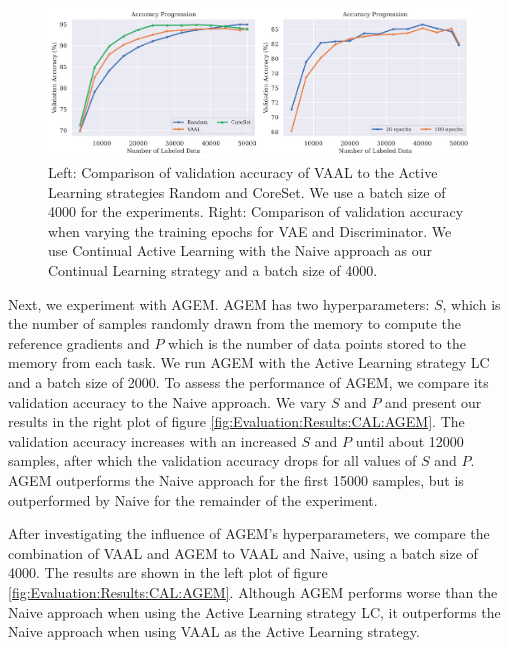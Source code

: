\begin{figure}[h]
    \centering
    \includegraphics[width=\linewidth]{images/results_CAL/VAAL_plots.png}
    \caption[Continual Active Learning Custom Replay strategy]{Left: Comparison of validation accuracy of VAAL to the Active Learning strategies Random and CoreSet. We use a batch size of 4000 for the experiments. Right: Comparison of validation accuracy when varying the training 
    epochs for VAE and Discriminator. We use Continual Active Learning with the Naive approach as our Continual Learning strategy and a batch size of 4000.}
    \label{fig:Evaluation:Results:CAL:VAAL}
\end{figure}

Next, we experiment with AGEM. AGEM has two hyperparameters: $S$, which is the number of samples randomly drawn from the memory to compute the reference gradients and $P$ which is the number of data points stored to the memory from each task. We run AGEM with the Active Learning
strategy LC and a batch size of 2000. To assess the performance of AGEM, we compare its validation accuracy to the Naive approach. We vary $S$ and $P$ and present our results in the right plot of figure \ref{fig:Evaluation:Results:CAL:AGEM}. The validation accuracy increases with
an increased $S$ and $P$ until about 12000 samples, after which the validation accuracy drops for all values of $S$ and $P$. AGEM outperforms the Naive approach for the first 15000 samples, but is outperformed by Naive for the remainder of the experiment. \par
After investigating the influence of AGEM's hyperparameters, we compare the combination of VAAL and AGEM to VAAL and Naive, using a batch size of 4000. The results are shown in the left plot of figure \ref{fig:Evaluation:Results:CAL:AGEM}. Although AGEM performs worse than the Naive
approach when using the Active Learning strategy LC, it outperforms the Naive approach when using VAAL as the Active Learning strategy. \par

